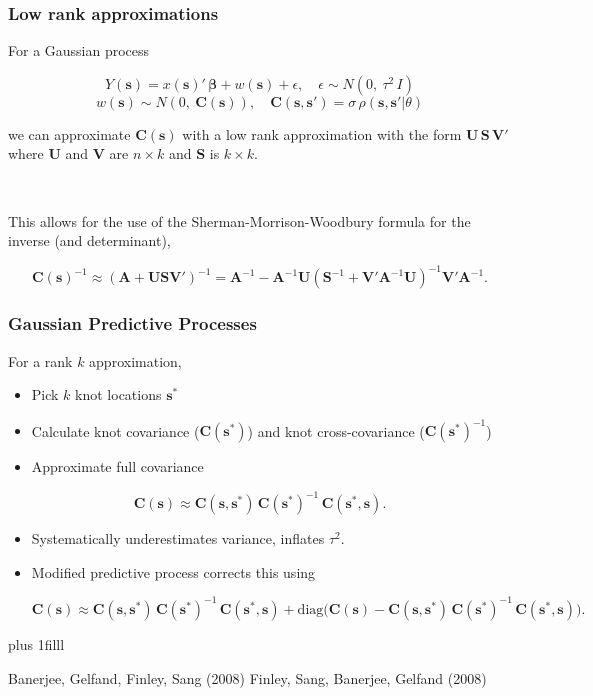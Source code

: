 \documentclass[t]{beamer}\usepackage[]{graphicx}\usepackage[]{color}
\newcommand{\vvfill}{\vskip0pt plus 1filll}
\begin{document}

\begin{frame}
\frametitle{Low rank approximations}

For a Gaussian process

\[ Y(\bm{s}) = x(\bm{s})' \, \bm{\beta} + w(\bm{s}) + \epsilon, \quad \epsilon \sim N(0,~\tau^2 \, I) \]
%
\[ w(\bm{s}) \sim N(0,~\bm{C}(\bm{s})), \quad \bm{C}(\bm{s},\bm{s}')=\sigma\,\rho(\bm{s},\bm{s}'|\theta) \]

we can approximate $\bm{C}(\bm{s})$ with a low rank approximation with the form $\bm{U}\,\bm{S}\,\bm{V}'$ where $\bm{U}$ and $\bm{V}$ are $n \times k$ and $\bm{S}$ is $k \times k$.

~\\\pause

This allows for the use of the Sherman-Morrison-Woodbury formula for the inverse (and determinant),

\[
\bm{C}(\bm{s})^{-1} \approx
 \left(\bm{A} + \bm{U}\bm{S}\bm{V'}\right)^{-1} = 
\bm{A}^{-1} - \bm{A}^{-1} \bm{U} \left(\bm{S}^{-1}+\bm{V}' \bm{A}^{-1} \bm{U}\right)^{-1}\bm{V}' \bm{A}^{-1}.
\]


\end{frame}


\begin{frame}
\frametitle{Gaussian Predictive Processes}

For a rank $k$ approximation,

\begin{itemize}
\item Pick $k$ knot locations $\bm{s}^*$
\item Calculate knot covariance ($\bm{C}(\bm{s}^*)$) and knot cross-covariance ($\bm{C}(\bm{s}^*)^{-1}$)
\item Approximate full covariance
\end{itemize}

\[\bm{C}(\bm{s}) \approx \bm{C}(\bm{s},\bm{s}^*) \, \bm{C}(\bm{s}^*)^{-1} \, \bm{C}(\bm{s}^*,\bm{s}).\]


\begin{itemize}
\item Systematically underestimates variance, inflates $\tau^2$. 

\item Modified predictive process corrects this using 

{\small
\[
\bm{C}(\bm{s}) \approx
\bm{C}(\bm{s},\bm{s}^*) \, \bm{C}(\bm{s}^*)^{-1} \, \bm{C}(\bm{s}^*,\bm{s}) + \text{diag}\Big(\bm{C}(\bm{s}) - \bm{C}(\bm{s},\bm{s}^*) \, \bm{C}(\bm{s}^*)^{-1} \, \bm{C}(\bm{s}^*,\bm{s})\Big).
\]
}
\end{itemize}

\vvfill

{\footnotesize
\begin{center}
Banerjee, Gelfand, Finley, Sang (2008) \quad Finley, Sang, Banerjee, Gelfand (2008)
\end{center}
}
\end{frame}
\end{document}
